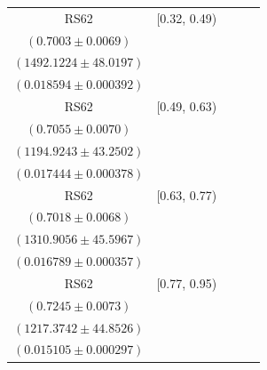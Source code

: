 {\begin{longtable}{|c|c|c|c|c|}
RS62 & [0.32, 0.49) & \begin{tabular}{@{}c@{}}$0.7214 \pm 0.0083$ \\ $(0.7003 \pm 0.0069)$\end{tabular} & \begin{tabular}{@{}c@{}}$1448.6328 \pm 46.6613$ \\ $(1492.1224 \pm 48.0197)$\end{tabular} & \begin{tabular}{@{}c@{}}$0.016862 \pm 0.000699$ \\ $(0.018594 \pm 0.000392)$\end{tabular} \\ \hline
RS62 & [0.49, 0.63) & \begin{tabular}{@{}c@{}}$0.7178 \pm 0.0084$ \\ $(0.7055 \pm 0.0070)$\end{tabular} & \begin{tabular}{@{}c@{}}$1178.6403 \pm 42.5323$ \\ $(1194.9243 \pm 43.2502)$\end{tabular} & \begin{tabular}{@{}c@{}}$0.016977 \pm 0.000698$ \\ $(0.017444 \pm 0.000378)$\end{tabular} \\ \hline
RS62 & [0.63, 0.77) & \begin{tabular}{@{}c@{}}$0.7099 \pm 0.0085$ \\ $(0.7018 \pm 0.0068)$\end{tabular} & \begin{tabular}{@{}c@{}}$1293.1758 \pm 45.1220$ \\ $(1310.9056 \pm 45.5967)$\end{tabular} & \begin{tabular}{@{}c@{}}$0.015061 \pm 0.000633$ \\ $(0.016789 \pm 0.000357)$\end{tabular} \\ \hline
RS62 & [0.77, 0.95) & \begin{tabular}{@{}c@{}}$0.7097 \pm 0.0086$ \\ $(0.7245 \pm 0.0073)$\end{tabular} & \begin{tabular}{@{}c@{}}$1247.0405 \pm 45.8115$ \\ $(1217.3742 \pm 44.8526)$\end{tabular} & \begin{tabular}{@{}c@{}}$0.013884 \pm 0.000534$ \\ $(0.015105 \pm 0.000297)$\end{tabular} \\ \hline

\end{longtable}}

